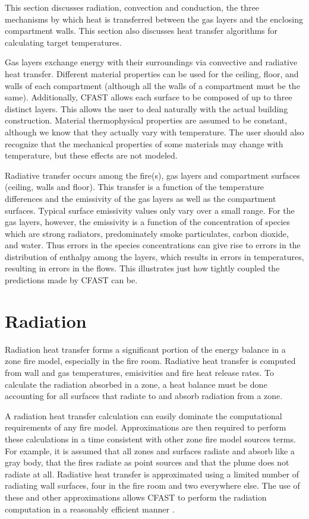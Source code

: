 This section discusses radiation, convection and conduction, the three mechanisms by which heat is transferred between the gas layers and the enclosing compartment walls.  This section also discusses heat transfer algorithms for calculating target temperatures.

Gas layers exchange energy with their surroundings via convective and radiative heat transfer.  Different material properties can be used for the ceiling, floor, and walls of each compartment (although all the walls of a compartment must be the same).  Additionally, CFAST allows each surface to be composed of up to three distinct layers.  This allows the user to deal naturally with the actual building construction.  Material thermophysical properties are assumed to be constant, although we know that they actually vary with temperature. The user should also recognize that the mechanical properties of some materials may change with temperature, but these effects are not modeled.						

Radiative transfer occurs among the fire(s), gas layers and compartment surfaces (ceiling, walls and floor).  This transfer is a function of the temperature differences and the emissivity of the gas layers as well as the compartment surfaces.  Typical surface emissivity values only vary over a small range.  For the gas layers, however, the emissivity is a function of the concentration of species which are strong radiators, predominately smoke particulates, carbon dioxide, and water.  Thus errors in the species concentrations can give rise to errors in the distribution of enthalpy among the layers, which results in errors in temperatures, resulting in errors in the flows.  This illustrates just how tightly coupled the predictions made by CFAST can be.

\section{Radiation}
\label{sec:Radiation}

Radiation heat transfer forms a significant portion of the energy balance in a zone fire model, especially in the fire room.  Radiative heat transfer is computed from wall and gas temperatures, emisivities and fire heat release rates.  To calculate the radiation absorbed in a zone, a heat balance must be done accounting for all surfaces that radiate to and absorb radiation from a zone.

A radiation heat transfer calculation can easily dominate the computational requirements of any fire model.  Approximations are then required to perform these calculations in a time consistent with other zone fire model sources terms.  For example, it is assumed that all zones and surfaces radiate and absorb like a gray body, that the fires radiate as point sources and that the plume does not radiate at all.  Radiative heat transfer is approximated using a limited number of radiating wall surfaces, four in the fire room and two everywhere else.  The use of these and other approximations allows CFAST to perform the radiation computation in a reasonably efficient manner \cite{Forney_radiation}.

